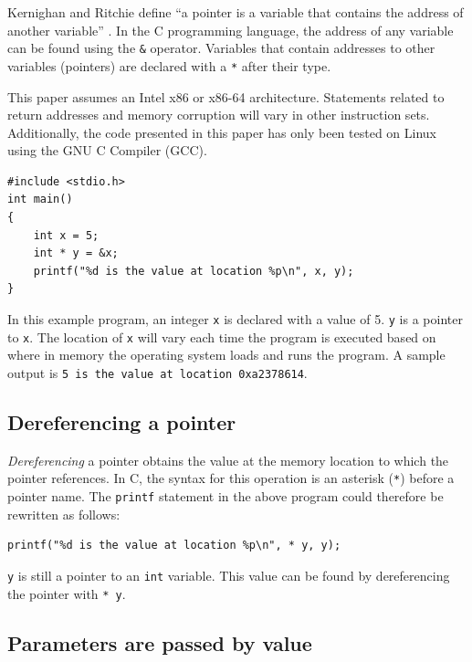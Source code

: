 \documentclass{book}
\begin{document}
Kernighan and Ritchie define ``a pointer is a variable that contains the address of another variable'' \cite{Kernighan:1988:CPL:576122}. In the C programming language, the address of any variable can be found using the \texttt{\&} operator. Variables that contain addresses to other variables (pointers) are declared with a \texttt{*} after their type.

This paper assumes an Intel x86 or x86-64 architecture. Statements related to return addresses and memory corruption will vary in other instruction sets. Additionally, the code presented in this paper has only been tested on Linux using the GNU C Compiler (GCC).

\begin{lstlisting}[caption={Pointers are variables containing memory addresses}, captionpos=b, mathescape, xleftmargin=.25in, xrightmargin=.25in]
#include <stdio.h>
int main()
{
    int x = 5;
    int * y = &x;    
    printf("%d is the value at location %p\n", x, y);
}
\end{lstlisting}
In this example program, an integer \texttt{x} is declared with a value of 5. \texttt{y} is a pointer to \texttt{x}. The location of \texttt{x} will vary each time the program is executed based on where in memory the operating system loads and runs the program. A sample output is \texttt{5 is the value at location 0xa2378614}. 

\subsection{Dereferencing a pointer}

\textit{Dereferencing} a pointer obtains the value at the memory location to which the pointer references. In C, the syntax for this operation is an asterisk (\texttt{*}) before a pointer name. The \texttt{printf} statement in the above program could therefore be rewritten as follows:

\begin{lstlisting}[caption={Pointers are dereferenced with the \texttt{*} operator}, captionpos=b, mathescape, xleftmargin=.25in, xrightmargin=.25in]
    printf("%d is the value at location %p\n", * y, y);
\end{lstlisting}

\texttt{y} is still a pointer to an \texttt{int} variable. This value can be found by dereferencing the pointer with \texttt{* y}.

\subsection{Parameters are passed by value}
\end{document}
